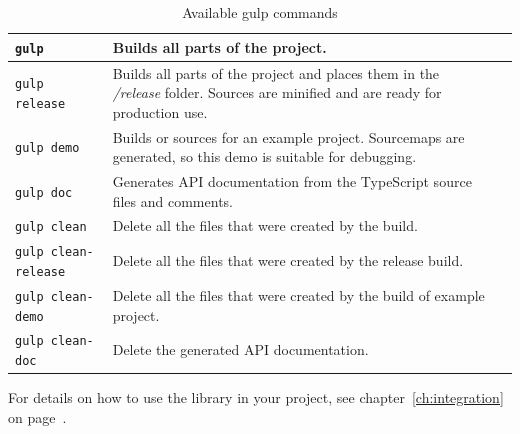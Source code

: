 \begin{table}[ht]
	\centering
	  \begin{tabular}{L{4cm}L{9cm}l} %
	  \hline
	  
	  \verb|gulp|             & Builds all parts of the project. & \\ \hline 
	  \verb|gulp release|	  &	Builds all parts of the project and places them in the \textit{/release} folder. Sources are minified and are ready for production use. & \\ \hline
	  \verb|gulp demo|		  &	Builds or sources for an example project. Sourcemaps are generated, so this demo is suitable for debugging. & \\ \hline
	  \verb|gulp doc|		  & Generates API documentation from the TypeScript source files and comments. & \\ \hline

	  \verb|gulp clean|       & Delete all the files that were created by the build.    & \\ \hline
	  \verb|gulp clean-release|       & Delete all the files that were created by the release build.    & \\ \hline
	  \verb|gulp clean-demo|       & Delete all the files that were created by the build of example project.    & \\ \hline
	  \verb|gulp clean-doc|       & Delete the generated API documentation.    & \\ \hline

	  \end{tabular}
	  \label{tbl:gulp}
	  \caption{Available gulp commands}
\end{table}


For details on how to use the library in your project, see chapter~\ref{ch:integration} on page~\pageref{ch:integration}.